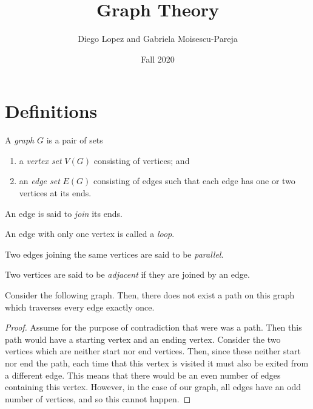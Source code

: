 \documentclass[12pt]{book}
\title{Graph Theory}
\author{Diego Lopez and Gabriela Moisescu-Pareja}
\date{Fall 2020}
\begin{document}
\maketitle

\chapter{Definitions}

\begin{definition}
A \emph{graph} \( G \) is a pair of sets
\begin{enumerate}
\item a \emph{vertex set} \( V(G) \) consisting of vertices; and
\item an \emph{edge set} \( E(G) \) consisting of edges such that each edge has one or two vertices at its ends.
\end{enumerate}
\end{definition}

\begin{definition}
An edge is said to \emph{join} its ends.
\end{definition}

\begin{definition}
An edge with only one vertex is called a \emph{loop}.
\end{definition}

\begin{definition}
Two edges joining the same vertices are said to be \emph{parallel}.
\end{definition}

\begin{definition}
Two vertices are said to be \emph{adjacent} if they are joined by an edge.
\end{definition}

\begin{proposition}
Consider the following graph.
Then, there does not exist a path on this graph which traverses every edge exactly once.
\end{proposition}

\begin{proof}
Assume for the purpose of contradiction that were was a path.
Then this path would have a starting vertex and an ending vertex.
Consider the two vertices which are neither start nor end vertices.
Then, since these neither start nor end the path, each time that this vertex is visited it must also be exited from a different edge.
This means that there would be an even number of edges containing this vertex.
However, in the case of our graph, all edges have an odd number of vertices, and so this cannot happen.
\end{proof}
\end{document}

